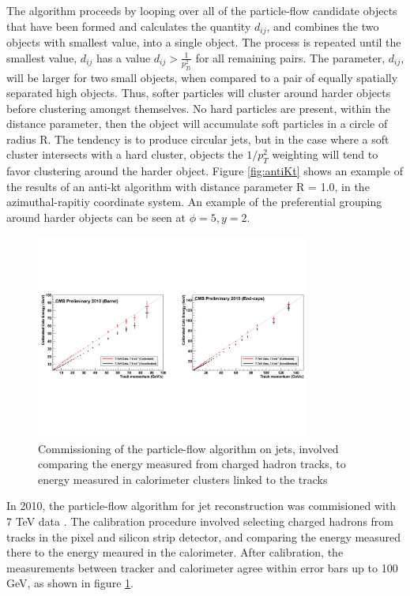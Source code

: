 \par The algorithm proceeds by looping over all of the particle-flow
candidate objects that have been formed and calculates the quantity
$d_{ij}$, and combines the two objects with smallest value, into a
single object.  The process is repeated until the smallest value,
$d_{ij}$ has a value $d_{ij} > \frac{1}{p_{Ti}^{2}}$ for all remaining
pairs.  The parameter, $d_{ij}$, will be larger for two small \PT
objects, when compared to a pair of equally spatially separated high
\PT objects.  Thus, softer particles will cluster around harder
objects before clustering amongst themselves.  No hard particles are
present, within the distance parameter, then the object will
accumulate soft particles in a circle of radius R.  The tendency is to
produce circular jets, but in the case where a soft \PT cluster intersects
with a hard \PT cluster, objects the $1/p_{T}^{2}$ weighting will tend
to favor clustering around the harder \PT object.  Figure
\ref{fig:antiKt} shows an example of the results of an anti-kt
algorithm with distance parameter R = 1.0, in the azimuthal-rapitiy
coordinate system.  An example of the preferential grouping around
harder \PT objects can be seen at $\phi=5, y=2$.  

\begin{figure}[h]
   \centering
  \includegraphics[width=0.8\textwidth]{Figures/Reconstruction_Diagrams/Jets__PFChargedHadronCalibration.pdf}
  \caption{Commissioning of the particle-flow algorithm on jets,
    involved comparing the energy measured from charged hadron tracks,
  to energy measured in calorimeter clusters linked to the tracks} \label{fig:chargedHadron_calib}
\end{figure}

\par In 2010, the particle-flow algorithm for jet reconstruction was
commisioned with 7 TeV data \cite{CMS-PAS-PFT-10-002}.  The
calibration procedure involved selecting charged hadrons from tracks
in the pixel and silicon strip detector, and comparing the energy
measured there to the energy meaured in the calorimeter.  After
calibration, the measurements between tracker and calorimeter agree
within error bars up to 100 GeV, as shown in figure
\ref{fig:chargedHadron_calib}. 

